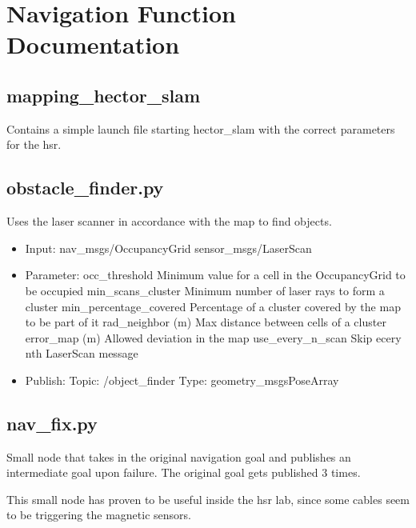 \documentclass[main.tex]{subfiles}
\begin{document}
	\begingroup

	\renewcommand{\cleardoublepage}{}

	\renewcommand{\clearpage}{}

	\chapter{Navigation Function Documentation}

		
		\section{mapping\_hector\_slam}
		Contains a simple launch file starting hector\_slam with the correct parameters for the hsr.
		
		\section{obstacle\_finder.py}
		Uses the laser scanner in accordance with the map to find objects.
		
		\begin{itemize}
			\item Input: 
				\subitem nav\_msgs/OccupancyGrid
				\subitem sensor\_msgs/LaserScan
			\item Parameter:
				\subitem occ\_threshold 
				Minimum value for a cell in the OccupancyGrid to be occupied
				\subitem min\_scans\_cluster
				Minimum number of laser rays to form a cluster
				\subitem min\_percentage\_covered
				Percentage of a cluster covered by the map to be part of it
				\subitem rad\_neighbor (m)
				Max distance between cells of a cluster
				\subitem error\_map (m)
				Allowed deviation in the map
				\subitem use\_every\_n\_scan
				Skip ecery nth LaserScan message 
			\item  Publish:
				\subitem Topic: /object\_finder
				\subitem Type: geometry\_msgsPoseArray
		\end{itemize}
		
		\section{nav\_fix.py}
		Small node that takes in the original navigation goal and publishes an intermediate goal upon failure. The original goal gets published 3 times.
		
		This small node has proven to be useful inside the hsr lab, since some cables seem to be triggering the magnetic sensors.

	\endgroup
\end{document}
